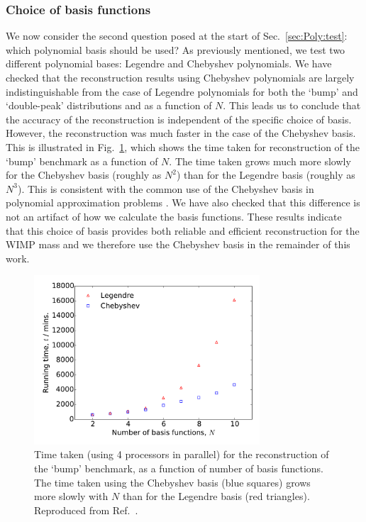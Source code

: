 \subsubsection{Choice of basis functions}

We now consider the second question posed at the start of Sec.~\ref{sec:Poly:test}: which polynomial basis should be used? As previously mentioned, we test two different polynomial bases: Legendre and Chebyshev polynomials. We have checked that the reconstruction results using Chebyshev polynomials are largely indistinguishable from the case of Legendre polynomials for both the `bump' and `double-peak' distributions and as a function of $N$. This leads us to conclude that the accuracy of the reconstruction is independent of the specific choice of basis. However, the reconstruction was much faster in the case of the Chebyshev basis. This is illustrated in Fig.~\ref{fig:Poly:times}, which shows the time taken for reconstruction of the `bump' benchmark as a function of $N$. The time taken grows much more slowly for the Chebyshev basis (roughly as $N^2$) than for the Legendre basis (roughly as $N^3$). This is consistent with the common use of the Chebyshev basis in polynomial approximation problems \cite{Mason:2002}. We have also checked that this difference is not an artifact of how we calculate the basis functions. These results indicate that this choice of basis provides both reliable and efficient reconstruction for the WIMP mass and we therefore use the Chebyshev basis in the remainder of this work.

\begin{figure}[ht!]
\centering
  \includegraphics[width=0.75\textwidth]{Poly/RunTimes.pdf}
  \caption[Time taken for the reconstruction of the `bump' benchmark as a function of number of basis functions for both the Chebyshev and Legendre bases.]{Time taken (using 4 processors in parallel) for the reconstruction of the `bump' benchmark, as a function of number of basis functions. The time taken using the Chebyshev basis (blue squares) grows more slowly with $N$ than for the Legendre basis (red triangles). Reproduced from Ref.~\cite{Kavanagh:2014}.}
  \label{fig:Poly:times}
\end{figure}

